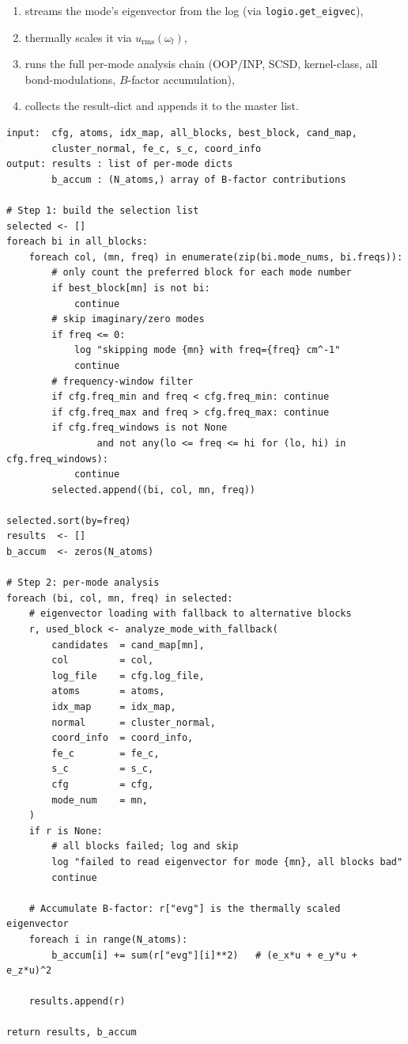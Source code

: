 \documentclass[10pt,a4paper,twoside]{article}
\newcommand{\urms}{u_{\mathrm{rms}}}
\newcommand{\fn}[1]{\texttt{#1}}
\begin{document}
\begin{enumerate}
  \item streams the mode's eigenvector from the log
        (via \fn{logio.get\_eigvec}),
  \item thermally scales it via $\urms(\omega_l)$,
  \item runs the full per-mode analysis chain (OOP/INP, SCSD,
        kernel-class, all bond-modulations, $B$-factor
        accumulation),
  \item collects the result-dict and appends it to the master list.
\end{enumerate}

\begin{lstlisting}[style=pseudo,
  caption={Main mode-analysis loop. Implementation:
           \protect\fn{runner.\_run\_analysis\_single},
           inner call: \protect\fn{core.analyze\_mode\_with\_fallback}.}]
input:  cfg, atoms, idx_map, all_blocks, best_block, cand_map,
        cluster_normal, fe_c, s_c, coord_info
output: results : list of per-mode dicts
        b_accum : (N_atoms,) array of B-factor contributions

# Step 1: build the selection list
selected <- []
foreach bi in all_blocks:
    foreach col, (mn, freq) in enumerate(zip(bi.mode_nums, bi.freqs)):
        # only count the preferred block for each mode number
        if best_block[mn] is not bi:
            continue
        # skip imaginary/zero modes
        if freq <= 0:
            log "skipping mode {mn} with freq={freq} cm^-1"
            continue
        # frequency-window filter
        if cfg.freq_min and freq < cfg.freq_min: continue
        if cfg.freq_max and freq > cfg.freq_max: continue
        if cfg.freq_windows is not None
                and not any(lo <= freq <= hi for (lo, hi) in cfg.freq_windows):
            continue
        selected.append((bi, col, mn, freq))

selected.sort(by=freq)
results  <- []
b_accum  <- zeros(N_atoms)

# Step 2: per-mode analysis
foreach (bi, col, mn, freq) in selected:
    # eigenvector loading with fallback to alternative blocks
    r, used_block <- analyze_mode_with_fallback(
        candidates  = cand_map[mn],
        col         = col,
        log_file    = cfg.log_file,
        atoms       = atoms,
        idx_map     = idx_map,
        normal      = cluster_normal,
        coord_info  = coord_info,
        fe_c        = fe_c,
        s_c         = s_c,
        cfg         = cfg,
        mode_num    = mn,
    )
    if r is None:
        # all blocks failed; log and skip
        log "failed to read eigenvector for mode {mn}, all blocks bad"
        continue

    # Accumulate B-factor: r["evg"] is the thermally scaled eigenvector
    foreach i in range(N_atoms):
        b_accum[i] += sum(r["evg"][i]**2)   # (e_x*u + e_y*u + e_z*u)^2

    results.append(r)

return results, b_accum
\end{lstlisting}
\end{document}

